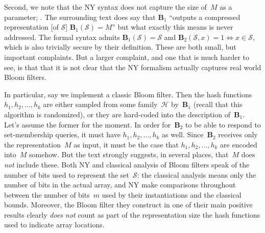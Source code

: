 Second, we note that the NY syntax does not capture the size of~$M$
as a parameter; 
. The surrounding
text does say that $\mathbf{B}_1$ ``outputs a compressed
representation [of $\mathcal{S}$] $\mathbf{B}_1(\mathcal{S})=M$''
but what exactly this means is never addressed.  The formal syntax
admits $\mathbf{B}_1(\mathcal{S})=\mathcal{S}$ and
$\mathbf{B}_2(\mathcal{S},x)=1 \Leftrightarrow x \in \mathcal{S}$,
which is also trivially secure by their definition.  These are both
small, but important complaints.  But a larger complaint, and one
that is much harder to see, is that that it is not clear that the NY
formalism actually captures real world Bloom filters.

In particular, say we implement a classic Bloom filter.  Then the
hash functions $h_1, h_2, \ldots, h_k$ are either sampled from some
family~$\mathcal{H}$ by~$\mathbf{B}_1$ (recall that this algorithm
is randomized), or they are hard-coded into the description
of~$\mathbf{B}_1$.  Let's assume the former for the moment.  In
order for~$\mathbf{B}_2$ to be able to respond to set-membership
queries, it must have $h_1,h_2,\ldots,h_k$ as well.
Since~$\mathbf{B}_2$ receives only the representation~$M$ as input,
it must be the case that $h_1,h_2,\ldots,h_k$ are encoded into~$M$
somehow.  But the text strongly suggests, in several places,
that~$M$ does \emph{not} include these.  Both NY and classical
analysis of Bloom filters speak of the number of bits used to
represent the set~$\mathcal{S}$: the classical analysis means only
the number of bits in the actual array, and NY make comparisons
throughout between the number of bits~$m$ used by their
instantiations and the classical bounds. Moreover, the Bloom filter
they construct in one of their main positive results clearly
\emph{does not} count as part of the representation size the hash
functions used to indicate array locations.

